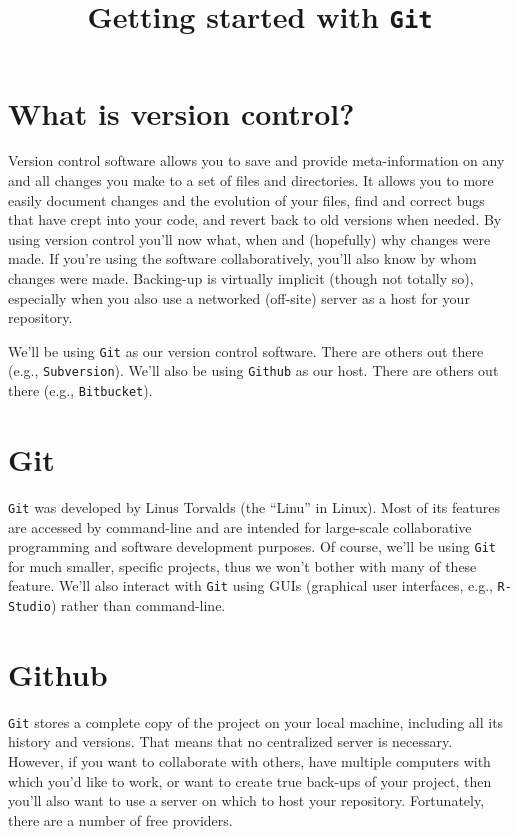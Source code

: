 \documentclass[12pt,letterpaper]{article}
\author{}
\title{Getting started with \texttt{Git}}
\date{}
\begin{document}
\maketitle

\tableofcontents

\pagebreak


\section{What is version control?}
Version control software allows you to save and provide meta-information on any and all changes you make to a set of files and directories.
It allows you to more easily document changes and the evolution of your files, find and correct bugs that have crept into your code, and revert back to old versions when needed.
By using version control you'll now what, when and (hopefully) why changes were made.
If you're using the software collaboratively, you'll also know by whom changes were made.
Backing-up is virtually implicit (though not totally so), especially when you also use a networked (off-site) server as a host for your repository.

We'll be using \texttt{Git} as our version control software.
There are others out there (e.g., \texttt{Subversion}).
We'll also be using \texttt{Github} as our host.
There are others out there (e.g., \texttt{Bitbucket}).

\section{Git}
\texttt{Git} was developed by Linus Torvalds (the ``Linu'' in Linux).
Most of its features are accessed by command-line and are intended for large-scale collaborative programming and software development purposes.
Of course, we'll be using \texttt{Git} for much smaller, specific projects, thus we won't bother with many of these feature.
We'll also interact with \texttt{Git} using GUIs (graphical user interfaces, e.g., \texttt{R-Studio}) rather than command-line.


\section{Github}
\texttt{Git} stores a complete copy of the project on your local machine, including all its history and versions.
That means that no centralized server is necessary.
However, if you want to collaborate with others, have multiple computers with which you'd like to work, or want to create true back-ups of your project, then you'll also want to use a server on which to host your repository.
Fortunately, there are a number of free providers.
\end{document}
